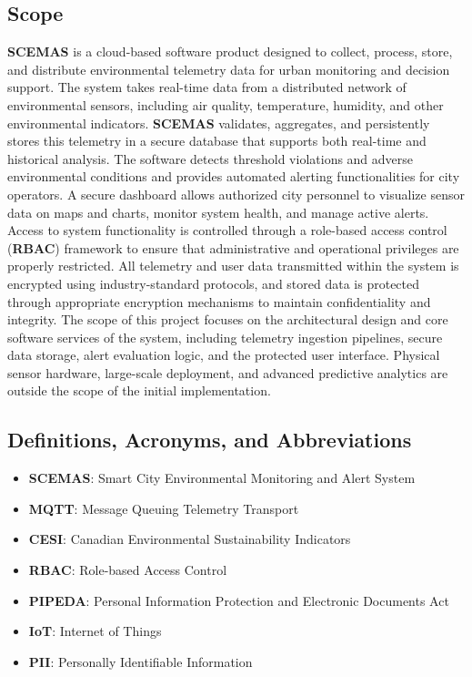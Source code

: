 \documentclass[]{article}
\begin{document}
\subsection{Scope}
\label{sub:scope}
\textbf{SCEMAS} is a cloud-based software product designed to collect, process, store, and distribute environmental telemetry data for urban monitoring and decision support. The system takes real-time data from a distributed network of environmental sensors, including air quality, temperature, humidity, and other environmental indicators. \textbf{SCEMAS} validates, aggregates, and persistently stores this telemetry in a secure database that supports both real-time and historical analysis. The software detects threshold violations and adverse environmental conditions and provides automated alerting functionalities for city operators. A secure dashboard allows authorized city personnel to visualize sensor data on maps and charts, monitor system health, and manage active alerts. Access to system functionality is controlled through a role-based access control (\textbf{RBAC}) framework to ensure that administrative and operational privileges are properly restricted. All telemetry and user data transmitted within the system is encrypted using industry-standard protocols, and stored data is protected through appropriate encryption mechanisms to maintain confidentiality and integrity. The scope of this project focuses on the architectural design and core software services of the system, including telemetry ingestion pipelines, secure data storage, alert evaluation logic, and the protected user interface. Physical sensor hardware, large-scale deployment, and advanced predictive analytics are outside the scope of the initial implementation.

\subsection{Definitions, Acronyms, and Abbreviations}
\label{sub:definitions_acronyms_and_abbreviations}
\begin{itemize}

	\item \textbf{SCEMAS}: Smart City Environmental Monitoring and Alert System
    \item \textbf{MQTT}: Message Queuing Telemetry Transport
    \item \textbf{CESI}: Canadian Environmental Sustainability Indicators
    \item \textbf{RBAC}: Role-based Access Control
    \item \textbf{PIPEDA}: Personal Information Protection and Electronic Documents Act
    \item \textbf{IoT}: Internet of Things
    \item \textbf{PII}: Personally Identifiable Information

\end{itemize}
\end{document}
